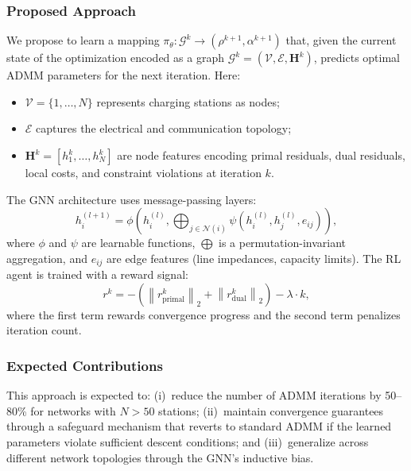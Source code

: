 \documentclass[review]{elsarticle}
\begin{document}
\subsubsection{Proposed Approach}

\hspace{0.5cm}We propose to learn a mapping $\pi_\theta: \mathcal{G}^k \rightarrow (\rho^{k+1}, \alpha^{k+1})$ that, given the current state of the optimization encoded as a graph $\mathcal{G}^k = (\mathcal{V}, \mathcal{E}, \mathbf{H}^k)$, predicts optimal ADMM parameters for the next iteration. Here:
\begin{itemize}
    \item $\mathcal{V} = \{1,\ldots,N\}$ represents charging stations as nodes;
    \item $\mathcal{E}$ captures the electrical and communication topology;
    \item $\mathbf{H}^k = [h_1^k, \ldots, h_N^k]$ are node features encoding primal residuals, dual residuals, local costs, and constraint violations at iteration $k$.
\end{itemize}

\hspace{0.5cm}The GNN architecture uses message-passing layers:
\begin{equation}
    h_i^{(l+1)} = \phi\left( h_i^{(l)}, \bigoplus_{j \in \mathcal{N}(i)} \psi\left(h_i^{(l)}, h_j^{(l)}, e_{ij}\right) \right),
    \label{eq:gnn}
\end{equation}
where $\phi$ and $\psi$ are learnable functions, $\bigoplus$ is a permutation-invariant aggregation, and $e_{ij}$ are edge features (line impedances, capacity limits). The RL agent is trained with a reward signal:
\begin{equation}
    r^k = -\left( \left\| r_{\text{primal}}^k \right\|_2 + \left\| r_{\text{dual}}^k \right\|_2 \right) - \lambda \cdot k,
    \label{eq:reward}
\end{equation}
where the first term rewards convergence progress and the second term penalizes iteration count.

\subsubsection{Expected Contributions}

\hspace{0.5cm}This approach is expected to: (i)~reduce the number of ADMM iterations by 50--80\% for networks with $N > 50$ stations; (ii)~maintain convergence guarantees through a safeguard mechanism that reverts to standard ADMM if the learned parameters violate sufficient descent conditions; and (iii)~generalize across different network topologies through the GNN's inductive bias.
\end{document}
